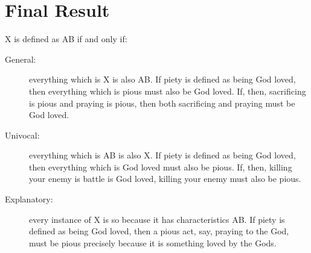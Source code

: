 \documentclass[oneside]{article}
\begin{document}
\section*{Final Result}
 X is defined as AB if and only if: 
\begin{description}
\item[General:] everything which is X is also AB. If piety is defined as being God loved, then everything which is pious must also be God loved. If, then, sacrificing is pious and praying is pious, then both sacrificing and praying must be God loved. 
\item[Univocal:] everything which is AB is also X. If piety is defined as being God loved, then everything which is God loved must also be pious. If, then, killing your enemy is battle is God loved, killing your enemy must also be pious. 
\item[Explanatory:]  every instance of X is so because it has characteristics AB. If piety is defined as being God loved, then a pious act, say, praying to the God, must be pious precisely because it is something loved by the Gods. 
\end{description}
\end{document}
